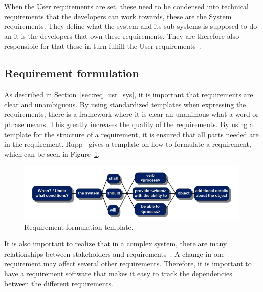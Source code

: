 When the User requirements are set, these need to be condensed into technical
requirements that the developers can work towards, these are the System
requirements. They define what the system and its sub-systems is supposed to do
an it is the developers that own these requirements. They are therefore also
responsible for that these in turn fulfill the User requirements~\cite{ibm_req}.

\subsection{Requirement formulation}
As described in Section~\ref{sec:req_usr_sys}, it is important that requirements
are clear and unambiguous. By using standardized templates when expressing the
requirements, there is a framework where it is clear an unanimous what a word or
phrase means.  This greatly increases the quality of the
requirements\cite{rupp2014}.  By using a template for the structure of a
requirement, it is ensured that all parts needed are in the requirement.
Rupp~\cite{rupp2014} gives a template on how to formulate a
requirement, which can be seen in Figure~\ref{fig:req_template}.
\begin{figure}[H]
    \centering
    \includegraphics[width=\textwidth]{./img/introduction_req_template.PNG}
    \caption{Requirement formulation template.}
    \label{fig:req_template}
\end{figure}
It is also important to realize that in a complex system, there are many
relationships between stakeholders and requirements~\cite{ibm_req}. A change in
one requirement may affect several other requirements. Therefore, it is
important to have a requirement software that makes it easy to track the
dependencies between the different requirements.

